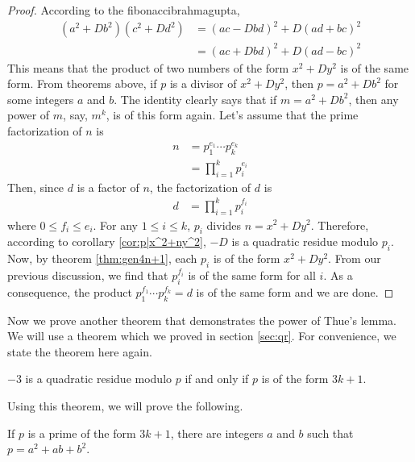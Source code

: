 \begin{proof}
	According to the \gls{fibonaccibrahmagupta},
		\begin{align*}
			(a^2+Db^2)(c^2+Dd^2)& =(ac-Dbd)^2+D(ad+bc)^2\\
			& =(ac+Dbd)^2+D(ad-bc)^2
		\end{align*}
	This means that the product of two numbers of the form $x^2+Dy^2$ is of the same form. From theorems above, if $p$ is a divisor of $x^2+Dy^2$, then $p=a^2+Db^2$ for some integers $a$ and $b$. The identity clearly says that if $m=a^2+Db^2$, then any power of $m$, say, $m^k$, is of this form again. Let's assume that the prime factorization of $n$ is
		\begin{align*}
			n
				& = p_1^{e_1}\cdots p_k^{e_k}\\
				& = \prod_{i=1}^{k}p_i^{e_i}
		\end{align*}
	Then, since $d$ is a factor of $n$, the factorization of $d$ is
		\begin{align*}
			d & = \prod_{i=1}^{k}p_i^{f_i}
		\end{align*}
	where $0\leq f_i\leq e_i$. For any $1\leq i\leq k$, $p_i$ divides $n=x^2+Dy^2$. Therefore, according to corollary \autoref{cor:p|x^2+ny^2}, $-D$ is a quadratic residue modulo $p_i$. Now, by theorem \autoref{thm:gen4n+1}, each $p_i$ is of the form $x^2+Dy^2$. From our previous discussion, we find that $p_i^{f_i}$ is of the same form for all $i$. As a consequence, the product $p_1^{f_1}\cdots p_k^{f_k}=d$ is of the same form and we are done.
\end{proof}
Now we prove another theorem that demonstrates the power of Thue's lemma. We will use a theorem which we proved in section \autoref{sec:qr}. For convenience, we state the theorem here again.
	\begin{theorem}
		$-3$ is a quadratic residue modulo $p$ if and only if $p$ is of the form $3k+1$.
	\end{theorem}
Using this theorem, we will prove the following.
	\begin{theorem}
		If $p$ is a prime of the form $3k+1$, there are integers $a$ and $b$ such that $p=a^2+ab+b^2$.
	\end{theorem}

